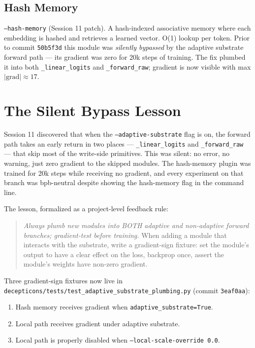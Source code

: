 \documentclass[11pt,openany]{book}
\theoremstyle{definition}
\theoremstyle{plain}
\begin{document}
\subsection{Hash Memory}
\texttt{--hash-memory} (Session 11 patch). A hash-indexed associative
memory where each embedding is hashed and retrieves a learned vector. O(1)
lookup per token. Prior to commit \texttt{50b5f3d} this module was
\emph{silently bypassed} by the adaptive substrate forward path --- its
gradient was zero for 20k steps of training. The fix plumbed it into both
\texttt{\_linear\_logits} and \texttt{\_forward\_raw}; gradient is now
visible with max $|\mathrm{grad}| \approx 17$.

\section{The Silent Bypass Lesson}

Session 11 discovered that when the \texttt{--adaptive-substrate} flag is
on, the forward path takes an early return in two places ---
\texttt{\_linear\_logits} and \texttt{\_forward\_raw} --- that skip most
of the write-side primitives. This was silent: no error, no warning,
just zero gradient to the skipped modules. The hash-memory plugin was
trained for 20k steps while receiving no gradient, and every experiment
on that branch was bpb-neutral despite showing the hash-memory flag in
the command line.

The lesson, formalized as a project-level feedback rule:

\begin{quote}
\emph{Always plumb new modules into BOTH adaptive and non-adaptive forward
branches; gradient-test before training.} When adding a module that
interacts with the substrate, write a gradient-sign fixture: set the
module's output to have a clear effect on the loss, backprop once, assert
the module's weights have non-zero gradient.
\end{quote}

Three gradient-sign fixtures now live in
\texttt{decepticons/tests/test\_adaptive\_substrate\_plumbing.py} (commit
\texttt{3eaf0aa}):
\begin{enumerate}
  \item Hash memory receives gradient when \texttt{adaptive\_substrate=True}.
  \item Local path receives gradient under adaptive substrate.
  \item Local path is properly disabled when \texttt{--local-scale-override 0.0}.
\end{enumerate}
\end{document}
